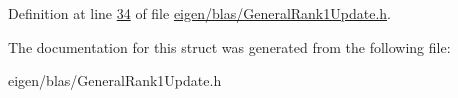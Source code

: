 Definition at line \hyperlink{eigen_2blas_2_general_rank1_update_8h_source_l00034}{34} of file \hyperlink{eigen_2blas_2_general_rank1_update_8h_source}{eigen/blas/\+General\+Rank1\+Update.\+h}.



The documentation for this struct was generated from the following file\+:\begin{DoxyCompactItemize}
\item 
eigen/blas/\+General\+Rank1\+Update.\+h\end{DoxyCompactItemize}
